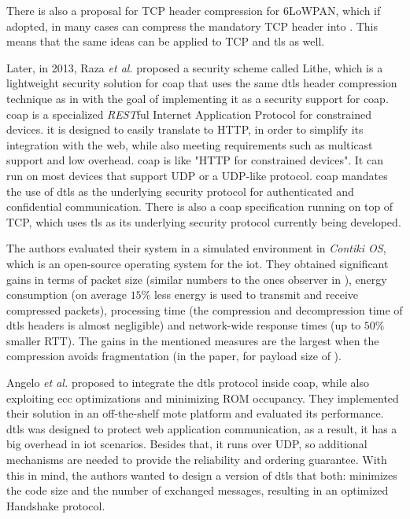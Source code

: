\documentclass{llncs}
\begin{document}
There is also a proposal for TCP header compression for 6LoWPAN\cite{I-D.aayadi-6lowpan-tcphc},
which if adopted, in many cases can compress the mandatory  TCP header
into . This means that the same ideas can be applied to TCP and
\gls{tls} as well.

Later, in 2013, Raza \textit{et al.} proposed a security scheme called Lithe\cite{LitheLig40:online},
which is a lightweight security solution for \gls{coap} that uses the same \gls{dtls} header
compression technique as in \cite{6LoWPANC53:online} with the goal of implementing
it as a security support for \gls{coap}. \gls{coap}\cite{RFC7959} is a specialized
\textit{REST}ful Internet Application Protocol for constrained devices. it is designed to easily
translate to HTTP, in order to simplify its integration with the web,
while also meeting requirements such as multicast support and low overhead.
\gls{coap} is like "HTTP for constrained devices".
It can run on most devices that support UDP or a UDP-like protocol.
\gls{coap} mandates the use of \gls{dtls} as the underlying security protocol for
authenticated and confidential communication. There is also a \gls{coap} specification
running on top of TCP, which uses \gls{tls} as its underlying security protocol
currently being developed\cite{I-D.ietf-core-coap-tcp-tls}.

The authors evaluated their system in a simulated environment in \textit{Contiki OS}\cite{ContikiT75:online}, which is an open-source operating system for the \gls{iot}.
They obtained significant gains in terms of packet size (similar numbers to the
ones observer in \cite{6LoWPANC53:online}), energy consumption (on average $15\%$ less
energy is used to transmit and receive compressed packets), processing time
(the compression and decompression time of \gls{dtls} headers is almost negligible)
and network-wide response times (up to $50\%$ smaller RTT). The
gains in the mentioned measures are the largest when the compression avoids
fragmentation (in the paper, for payload size of ).

Angelo \textit{et al.} \cite{Security5:online} proposed to integrate the \gls{dtls} protocol
inside \gls{coap}, while also exploiting \gls{ecc} optimizations and minimizing
ROM occupancy. They implemented their solution in an off-the-shelf mote platform
and evaluated its performance. \gls{dtls} was designed to protect web application communication, as a result,
it has a big overhead in \gls{iot} scenarios. Besides that, it runs over UDP,
so additional mechanisms are needed to provide the reliability and ordering
guarantee. With this in mind, the authors wanted to design a version of \gls{dtls}
that both: minimizes the code size and the number of exchanged messages, resulting
in an optimized Handshake protocol.
\end{document}
